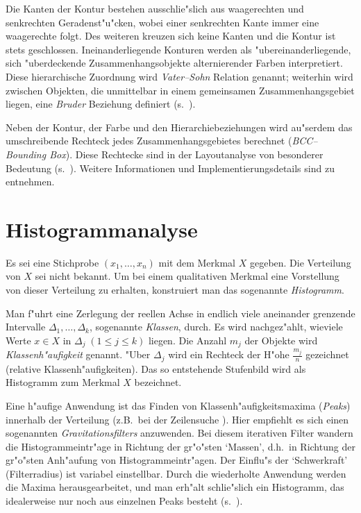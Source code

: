 Die Kanten der Kontur bestehen
ausschlie"slich aus waagerechten und senkrechten Ge\-ra\-den\-st"u"cken, 
wobei einer senkrechten Kante
immer eine waagerechte folgt. Des weiteren kreuzen sich keine Kanten und die Kontur
ist stets geschlossen.
Ineinanderliegende Konturen werden als "ubereinanderliegende, sich "uberdeckende Zusammenhangsobjekte
alternierender Farben interpretiert. Diese hierarchische Zuordnung wird {\em Vater--Sohn} Relation
genannt; weiterhin wird zwischen Objekten, die unmittelbar in einem gemeinsamen
Zusammenhangsgebiet liegen, eine {\em Bruder} Beziehung definiert (s.~).


Neben der Kontur, der Farbe und den Hierarchiebeziehungen wird 
au"serdem das umschreibende Rechteck jedes Zusammenhangsgebietes berechnet 
({\em BCC--Bounding Box\/}).
Diese Rechtecke sind in der Layoutanalyse von besonderer Bedeutung 
(s.~). Weitere Informationen und Implementierungsdetails sind \cite{MaOb90} 
zu entnehmen.


\section{Histogrammanalyse}\label{Histogrammanalyse}

Es sei eine Stichprobe $(x_1,\ldots,x_n)$ mit dem Merkmal $X$ gegeben. Die Verteilung von $X$
sei nicht bekannt. Um bei einem qualitativen Merkmal eine Vorstellung von dieser Verteilung
zu erhalten, konstruiert man das sogenannte {\em Histogramm}.

Man f"uhrt eine Zerlegung der reellen Achse in endlich viele aneinander grenzende Intervalle 
$\Delta_1,\ldots,\Delta_k$, sogenannte {\em Klassen}, durch. Es wird nachgez"ahlt, wieviele
Werte $x \in X$ in $\Delta_j \; (1 \le j \le k)$ liegen. Die Anzahl $m_j$ der Objekte wird
{\em Klassenh"aufigkeit\/} genannt. 
"Uber $\Delta_j$ wird ein Rechteck der H"ohe $\frac{m_j}{n}$ gezeichnet
(relative Klassenh"aufigkeiten). Das so entstehende Stufenbild wird als Histogramm 
zum Merkmal $X$ bezeichnet.

Eine h"aufige Anwendung ist das Finden von Klassenh"aufigkeitsmaxima ({\em Peaks\/}) innerhalb der Verteilung
(z.B.\ bei der Zeilensuche ).
Hier empfiehlt es sich einen sogenannten {\em Gravitationsfilters\/} anzuwenden.
Bei diesem iterativen Filter wandern die
Histogrammeintr"age in Richtung der gr"o"sten `Massen', d.h.\ in Richtung der gr"o"sten Anh"aufung von
Histogrammeintr"agen. Der Einflu"s der `Schwerkraft' (Filterradius) ist variabel einstellbar.
Durch die wiederholte Anwendung werden die Maxima herausgearbeitet, und man erh"alt schlie"slich ein 
Histogramm, das idealerweise nur noch aus einzelnen Peaks besteht (s.\ ).


